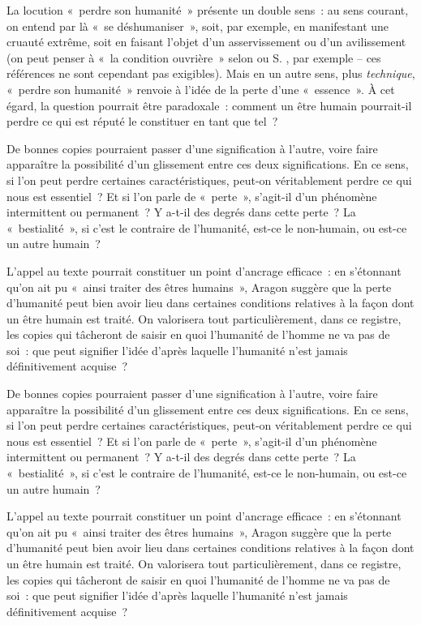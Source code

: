 {La locution «~perdre son humanité~» présente un double sens~: au sens courant, on
entend par là «~se déshumaniser~», soit, par exemple, en manifestant une cruauté
extrême, soit en faisant l'objet d'un asservissement ou d'un avilissement (on peut
penser à «~la condition ouvrière~» selon  ou S. , par exemple – ces références
ne sont cependant pas exigibles). Mais en un autre sens, plus \textit{technique}, «~perdre son
humanité~» renvoie à l'idée de la perte d'une «~essence~». À cet égard, la question
pourrait être paradoxale~: comment un être humain pourrait-il perdre ce qui est réputé
le constituer en tant que tel~?

De bonnes copies pourraient passer d'une signification à l'autre, voire faire apparaître
la possibilité d'un glissement entre ces deux significations. En ce sens, si l'on peut
perdre certaines caractéristiques, peut-on véritablement perdre ce qui nous est
essentiel~? Et si l'on parle de «~perte~», s'agit-il d'un phénomène intermittent ou
permanent~? Y a-t-il des degrés dans cette perte~? La «~bestialité~», si c'est le contraire
de l'humanité, est-ce le non-humain, ou est-ce un autre humain~?

L'appel au texte pourrait constituer un point d'ancrage efficace~: en s'étonnant qu'on
ait pu «~ainsi traiter des êtres humains~», Aragon suggère que la perte d'humanité peut
bien avoir lieu dans certaines conditions relatives à la façon dont un être humain est
traité. On valorisera tout particulièrement, dans ce registre, les copies qui tâcheront de
saisir en quoi l'humanité de l'homme ne va pas de soi~: que peut signifier l'idée d'après
laquelle l'humanité n'est jamais définitivement acquise~?

De bonnes copies pourraient passer d'une signification à l'autre, voire faire apparaître
la possibilité d'un glissement entre ces deux significations. En ce sens, si l'on peut
perdre certaines caractéristiques, peut-on véritablement perdre ce qui nous est
essentiel~? Et si l'on parle de «~perte~», s'agit-il d'un phénomène intermittent ou
permanent~? Y a-t-il des degrés dans cette perte~? La «~bestialité~», si c'est le contraire
de l'humanité, est-ce le non-humain, ou est-ce un autre humain~?

L'appel au texte pourrait constituer un point d'ancrage efficace~: en s'étonnant qu'on
ait pu «~ainsi traiter des êtres humains~», Aragon suggère que la perte d'humanité peut
bien avoir lieu dans certaines conditions relatives à la façon dont un être humain est
traité. On valorisera tout particulièrement, dans ce registre, les copies qui tâcheront de
saisir en quoi l'humanité de l'homme ne va pas de soi~: que peut signifier l'idée d'après
laquelle l'humanité n'est jamais définitivement acquise~?

}
